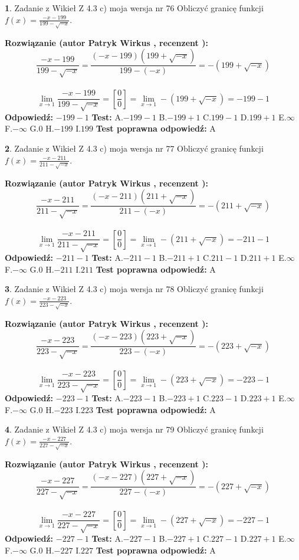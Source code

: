\documentclass[12pt, a4paper]{article}
\theoremstyle{definition} %
\newtheorem{zad}{}
\newcommand{\zadStart}[1]{\begin{zad}#1\newline}
\newcommand{\zadStop}{\end{zad}}
\newcommand{\rozwStart}[2]{\noindent \textbf{Rozwiązanie (autor #1 , recenzent #2): }\newline}
\newcommand{\rozwStop}{\newline}
\newcommand{\odpStart}{\noindent \textbf{Odpowiedź:}\newline}
\newcommand{\odpStop}{\newline}
\newcommand{\testStart}{\noindent \textbf{Test:}\newline}
\newcommand{\testStop}{\newline}
\newcommand{\kluczStart}{\noindent \textbf{Test poprawna odpowiedź:}\newline}
\newcommand{\kluczStop}{\newline}
\begin{document}
\zadStart{Zadanie z Wikieł Z 4.3 c) moja wersja nr 76}
Obliczyć granicę funkcji $f(x)=\frac{-x-199}{199-\sqrt{-x}}$.
\zadStop
\rozwStart{Patryk Wirkus}{}
$$\frac{-x-199}{199-\sqrt{-x}}=\frac{(-x-199)(199+\sqrt{-x})}{199-(-x)}=-(199+\sqrt{-x})$$
\\
$$\lim\limits_{x\to1}\frac{-x-199}{199-\sqrt{-x}}=[\frac{0}{0}]=\lim\limits_{x\to1}-(199+\sqrt{-x}) =-199-1$$
\rozwStop
\odpStart
$-199-1$
\odpStop
\testStart
A.$-199-1$
B.$-199+1$
C.$199-1$
D.$199+1$
E.$\infty$
F.$-\infty$
G.$0$
H.$-199$
I.$199$
\testStop
\kluczStart
A
\kluczStop



\zadStart{Zadanie z Wikieł Z 4.3 c) moja wersja nr 77}
Obliczyć granicę funkcji $f(x)=\frac{-x-211}{211-\sqrt{-x}}$.
\zadStop
\rozwStart{Patryk Wirkus}{}
$$\frac{-x-211}{211-\sqrt{-x}}=\frac{(-x-211)(211+\sqrt{-x})}{211-(-x)}=-(211+\sqrt{-x})$$
\\
$$\lim\limits_{x\to1}\frac{-x-211}{211-\sqrt{-x}}=[\frac{0}{0}]=\lim\limits_{x\to1}-(211+\sqrt{-x}) =-211-1$$
\rozwStop
\odpStart
$-211-1$
\odpStop
\testStart
A.$-211-1$
B.$-211+1$
C.$211-1$
D.$211+1$
E.$\infty$
F.$-\infty$
G.$0$
H.$-211$
I.$211$
\testStop
\kluczStart
A
\kluczStop



\zadStart{Zadanie z Wikieł Z 4.3 c) moja wersja nr 78}
Obliczyć granicę funkcji $f(x)=\frac{-x-223}{223-\sqrt{-x}}$.
\zadStop
\rozwStart{Patryk Wirkus}{}
$$\frac{-x-223}{223-\sqrt{-x}}=\frac{(-x-223)(223+\sqrt{-x})}{223-(-x)}=-(223+\sqrt{-x})$$
\\
$$\lim\limits_{x\to1}\frac{-x-223}{223-\sqrt{-x}}=[\frac{0}{0}]=\lim\limits_{x\to1}-(223+\sqrt{-x}) =-223-1$$
\rozwStop
\odpStart
$-223-1$
\odpStop
\testStart
A.$-223-1$
B.$-223+1$
C.$223-1$
D.$223+1$
E.$\infty$
F.$-\infty$
G.$0$
H.$-223$
I.$223$
\testStop
\kluczStart
A
\kluczStop



\zadStart{Zadanie z Wikieł Z 4.3 c) moja wersja nr 79}
Obliczyć granicę funkcji $f(x)=\frac{-x-227}{227-\sqrt{-x}}$.
\zadStop
\rozwStart{Patryk Wirkus}{}
$$\frac{-x-227}{227-\sqrt{-x}}=\frac{(-x-227)(227+\sqrt{-x})}{227-(-x)}=-(227+\sqrt{-x})$$
\\
$$\lim\limits_{x\to1}\frac{-x-227}{227-\sqrt{-x}}=[\frac{0}{0}]=\lim\limits_{x\to1}-(227+\sqrt{-x}) =-227-1$$
\rozwStop
\odpStart
$-227-1$
\odpStop
\testStart
A.$-227-1$
B.$-227+1$
C.$227-1$
D.$227+1$
E.$\infty$
F.$-\infty$
G.$0$
H.$-227$
I.$227$
\testStop
\kluczStart
A
\kluczStop
\end{document}
